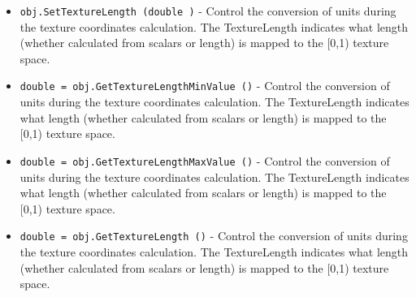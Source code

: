\begin{itemize}
\item  \verb|obj.SetTextureLength (double )| -  Control the conversion of units during the texture coordinates
 calculation. The TextureLength indicates what length (whether 
 calculated from scalars or length) is mapped to the [0,1)
 texture space.

\item  \verb|double = obj.GetTextureLengthMinValue ()| -  Control the conversion of units during the texture coordinates
 calculation. The TextureLength indicates what length (whether 
 calculated from scalars or length) is mapped to the [0,1)
 texture space.

\item  \verb|double = obj.GetTextureLengthMaxValue ()| -  Control the conversion of units during the texture coordinates
 calculation. The TextureLength indicates what length (whether 
 calculated from scalars or length) is mapped to the [0,1)
 texture space.

\item  \verb|double = obj.GetTextureLength ()| -  Control the conversion of units during the texture coordinates
 calculation. The TextureLength indicates what length (whether 
 calculated from scalars or length) is mapped to the [0,1)
 texture space.

\end{itemize}
